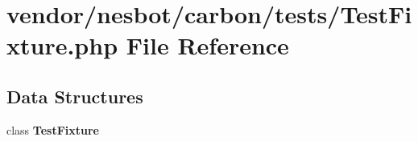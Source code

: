 \section{vendor/nesbot/carbon/tests/\+Test\+Fixture.php File Reference}
\label{_test_fixture_8php}
\subsection*{Data Structures}
\begin{DoxyCompactItemize}
\item 
class {\bf Test\+Fixture}
\end{DoxyCompactItemize}
